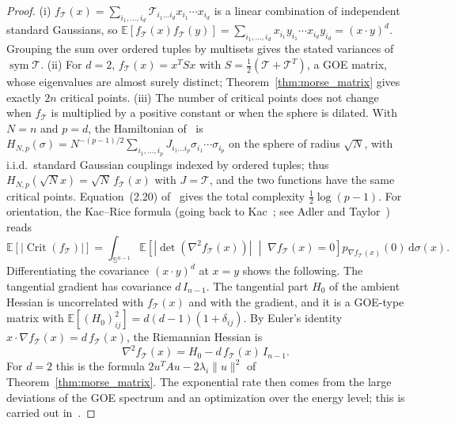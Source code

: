 \documentclass[11pt,a4paper,reqno]{amsart}
\theoremstyle{definition}
\numberwithin{equation}{section}
\newcommand{\Sph}{\mathbb{S}}
\newcommand{\dif}{\,\mathrm{d}}
\begin{document}
\begin{proof}
(i) $f_{\mathcal{T}}(x) = \sum_{i_1,\dots,i_d} \mathcal{T}_{i_1\dots i_d} x_{i_1}\cdots x_{i_d}$ is a linear combination of independent standard Gaussians, so $\mathbb{E}[f_{\mathcal{T}}(x) f_{\mathcal{T}}(y)] = \sum_{i_1,\dots,i_d} x_{i_1} y_{i_1} \cdots x_{i_d} y_{i_d} = (x\cdot y)^d$. Grouping the sum over ordered tuples by multisets gives the stated variances of $\operatorname{sym}\mathcal{T}$.
(ii) For $d = 2$, $f_{\mathcal{T}}(x) = x^T S x$ with $S = \frac12(\mathcal{T} + \mathcal{T}^T)$, a GOE matrix, whose eigenvalues are almost surely distinct; Theorem~\ref{thm:morse_matrix} gives exactly $2n$ critical points.
(iii) The number of critical points does not change when $f_{\mathcal{T}}$ is multiplied by a positive constant or when the sphere is dilated. With $N = n$ and $p = d$, the Hamiltonian of~\cite[Eq.~(2.2)]{auffinger2013random} is $H_{N,p}(\sigma) = N^{-(p-1)/2} \sum_{i_1, \dots, i_p} J_{i_1 \dots i_p} \sigma_{i_1} \cdots \sigma_{i_p}$ on the sphere of radius $\sqrt{N}$, with i.i.d.\ standard Gaussian couplings indexed by ordered tuples; thus $H_{N,p}(\sqrt{N} x) = \sqrt{N}\, f_{\mathcal{T}}(x)$ with $J = \mathcal{T}$, and the two functions have the same critical points. Equation~(2.20) of~\cite{auffinger2013random} gives the total complexity $\frac12\log(p-1)$. For orientation, the Kac--Rice formula (going back to Kac~\cite{kac1943average}; see Adler and Taylor~\cite{adler2007random}) reads
\begin{equation}
    \mathbb{E}[|\operatorname{Crit}(f_{\mathcal{T}})|] = \int_{\Sph^{n-1}} \mathbb{E}\left[ |\det(\nabla^2 f_{\mathcal{T}}(x))| \;\middle|\; \nabla f_{\mathcal{T}}(x) = 0 \right] p_{\nabla f_{\mathcal{T}}(x)}(0) \dif \sigma(x).
\end{equation}
Differentiating the covariance $(x\cdot y)^d$ at $x = y$ shows the following. The tangential gradient has covariance $d\, I_{n-1}$. The tangential part $H_0$ of the ambient Hessian is uncorrelated with $f_{\mathcal{T}}(x)$ and with the gradient, and it is a GOE-type matrix with $\mathbb{E}[(H_0)_{ij}^2] = d(d-1)(1+\delta_{ij})$. By Euler's identity $x \cdot \nabla f_{\mathcal{T}}(x) = d\, f_{\mathcal{T}}(x)$, the Riemannian Hessian is
\begin{equation}
    \nabla^2 f_{\mathcal{T}}(x) = H_0 - d\, f_{\mathcal{T}}(x)\, I_{n-1}.
\end{equation}
For $d = 2$ this is the formula $2u^TAu - 2\lambda_i\|u\|^2$ of Theorem~\ref{thm:morse_matrix}. The exponential rate then comes from the large deviations of the GOE spectrum and an optimization over the energy level; this is carried out in~\cite{auffinger2013random}.

\end{proof}
\end{document}
